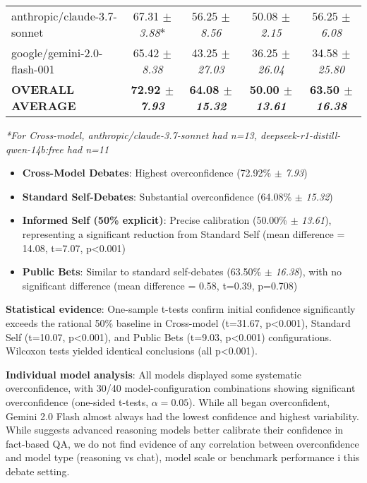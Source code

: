 \documentclass{article}
\begin{document}
\begin{table*}[htbp]
{\begin{tabular}{lcccc}
    anthropic/claude-3.7-sonnet                & 67.31 $\pm$ \textit{3.88}* & 56.25 $\pm$ \textit{8.56} & 50.08 $\pm$ \textit{2.15} & 56.25 $\pm$ \textit{6.08} \\
    google/gemini-2.0-flash-001                & 65.42 $\pm$ \textit{8.38} & 43.25 $\pm$ \textit{27.03} & 36.25 $\pm$ \textit{26.04} & 34.58 $\pm$ \textit{25.80} \\
    \midrule
    \textbf{OVERALL AVERAGE}                   & \textbf{72.92 $\pm$ \textit{7.93}} & \textbf{64.08 $\pm$ \textit{15.32}} & \textbf{50.00 $\pm$ \textit{13.61}} & \textbf{63.50 $\pm$ \textit{16.38}} \\
    \bottomrule
  \end{tabular}
  }
  \label{app:tab:initial_confidence}
  \vspace{0.2cm}
  \footnotesize{\textit{*For Cross-model, anthropic/claude-3.7-sonnet had n=13, deepseek-r1-distill-qwen-14b:free had n=11}}
\end{table*}
\begin{itemize}
    \item \textbf{Cross-Model Debates}: Highest overconfidence (72.92\% $\pm$ \textit{7.93})
    \item \textbf{Standard Self-Debates}: Substantial overconfidence (64.08\% $\pm$ \textit{15.32})
    \item \textbf{Informed Self (50\% explicit)}: Precise calibration (50.00\% $\pm$ \textit{13.61}), representing a significant reduction from Standard Self (mean difference = 14.08, t=7.07, p<0.001)
    \item \textbf{Public Bets}: Similar to standard self-debates (63.50\% $\pm$ \textit{16.38}), with no significant difference (mean difference = 0.58, t=0.39, p=0.708)
\end{itemize}

\textbf{Statistical evidence}: One-sample t-tests confirm initial confidence significantly exceeds the rational 50\% baseline in Cross-model (t=31.67, p<0.001), Standard Self (t=10.07, p<0.001), and Public Bets (t=9.03, p<0.001) configurations. Wilcoxon tests yielded identical conclusions (all p<0.001).

\textbf{Individual model analysis}: All models displayed some systematic overconfidence, with 30/40 model-configuration combinations showing significant overconfidence (one-sided t-tests, $\alpha=0.05$). While all began overconfident, Gemini 2.0 Flash almost always had the lowest confidence and highest variability. While \citet{yoon2025reasoningmodelsbetterexpress} suggests advanced reasoning models better calibrate their confidence in fact-based QA, we do not find evidence of any correlation between overconfidence and model type (reasoning vs chat), model scale or benchmark performance i this debate setting.
\end{document}
